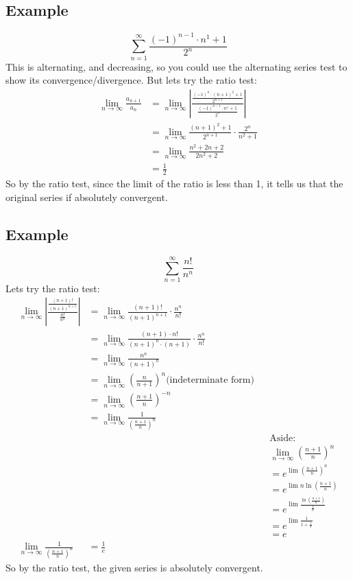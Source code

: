 \documentclass{report}
\begin{document}
    \subsection{Example}
        \[\sum_{n = 1}^{\infty} \frac{(-1)^{n-1} \cdot n^1 + 1}{2^n} \]
        This is alternating, and decreasing, so you could use the alternating series test to show its convergence/divergence.
        But lets try the ratio test:
        \begin{align*}
            \lim_{n \to \infty} \frac{a_{n+1}}{a_n} & = \lim_{n \to \infty} \left| \frac{\frac{(-1)^n \cdot (n+1)^2 + 1}{2^{n+1}}}{\frac{(-1)^{n-1} \cdot n^1 + 1}{2^n}} \right| \\
            & = \lim_{n \to \infty} \frac{(n+1)^2 + 1}{2^{n+1}} \cdot \frac{2^n}{n^2+1} \\
            & = \lim_{n \to \infty} \frac{n^2+2n+2}{2n^2+2} \\
            & = \frac{1}{2}
        \end{align*}
        So by the ratio test, since the limit of the ratio is less than 1, it tells us that the original series if absolutely convergent.
    
    \subsection{Example}
        \[\sum_{n = 1}^{\infty} \frac{n!}{n^n} \]
        Lets try the ratio test:
        \begin{align*}
            \lim_{n \to \infty} \left| \frac{\frac{(n+1)!}{(n+1)^{n+1}}}{\frac{n!}{n^n}} \right| & = \lim_{n \to \infty} \frac{(n+1)!}{(n+1)^{n+1}} \cdot \frac{n^n}{n!} \\
            & = \lim_{n \to \infty} \frac{(n+1) \cdot n!}{(n+1)^{n} \cdot (n+1)} \cdot \frac{n^n}{n!} \\
            & = \lim_{n \to \infty} \frac{n^n}{(n+1)^n} \\
            & = \lim_{n \to \infty} \left( \frac{n}{n+1} \right)^n \text{(indeterminate form)}\\
            & = \lim_{n \to \infty} \left( \frac{n+1}{n}\right)^{-n} \\
            & = \lim_{n \to \infty} \frac{1}{\left( \frac{n+1}{n}\right)^{n}} \\
            && &\text{Aside:} \\
            && &\lim_{n \to \infty} \left( \frac{n+1}{n}\right)^{n} \\
            && &= e^{\lim \left( \frac{n+1}{n}\right)^{n}} \\
            && &= e^{\lim n \ln \left( \frac{n+1}{n}\right)} \\
            && &= e^{\lim \frac{\ln \left( \frac{n+1}{n}\right)}{\frac{1}{n}}} \\
            && &= e^{\lim \frac{1}{1+\frac{1}{n}}} \\
            && &= e \\
            \lim_{n \to \infty} \frac{1}{\left( \frac{n+1}{n}\right)^{n}} &= \frac{1}{e}
        \end{align*}
       So by the ratio test, the given series is absolutely convergent.
    
\end{document}

